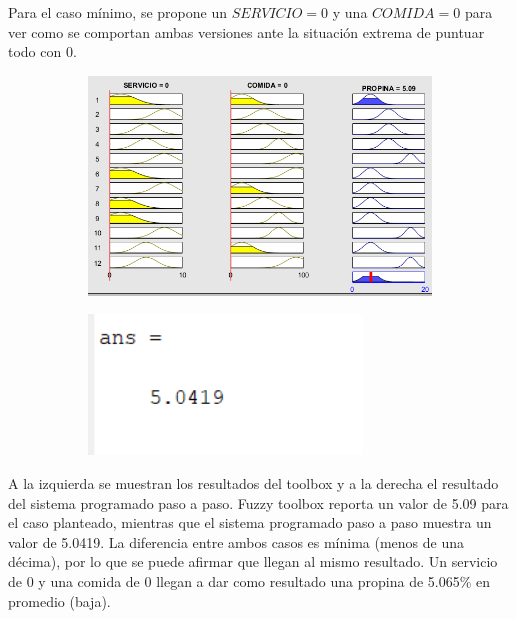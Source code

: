 \documentclass[11pt, letterpaper]{article}
\begin{document}
Para el caso mínimo, se propone un $SERVICIO = 0$ y una $COMIDA = 0$ para ver como se comportan ambas versiones ante la situación extrema de puntuar todo con 0.

\begin{figure}[h]
	\centering
	\begin{subfigure}{0.40\textwidth} %
		\centering
		\includegraphics[width=1.4\textwidth]{IMG/RP11.png}
		\label{fig:G3}
	\end{subfigure}
	\hfill
	\begin{subfigure}{0.42\textwidth} %
		\centering
		\includegraphics[width=0.8\textwidth]{IMG/M11.png}
		\label{fig:G4}
	\end{subfigure}
	\label{fig:comparacion2}
\end{figure}

A la izquierda se muestran los resultados del toolbox y a la derecha el resultado del sistema programado paso a paso. 
Fuzzy toolbox reporta un valor de 5.09 para el caso planteado, mientras que el sistema programado paso a paso muestra un valor de 5.0419. La diferencia entre ambos casos es mínima (menos de una décima), por lo que se puede afirmar que llegan al mismo resultado. Un servicio de 0 y una comida de 0 llegan a dar como resultado una propina de 5.065\% en promedio (baja).
\end{document}
